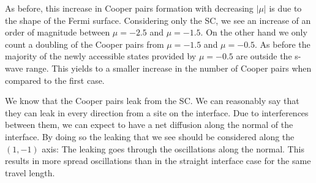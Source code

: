 \documentclass[..\main.tex]{subfile}
\begin{document}
As before, this increase in Cooper pairs formation with decreasing $|\mu|$ is due to the shape of the Fermi surface.
Considering only the SC, we see an increase of an order of magnitude between $\mu=-2.5$ and $\mu=-1.5$. On the other hand we only count
a doubling of the Cooper pairs from $\mu=-1.5$ and $\mu=-0.5$.
As before the majority of the newly accessible states provided by $\mu=-0.5$ are outside the s-wave range.
This yields to a smaller increase in the number of Cooper pairs when compared to the first case.


We know that the Cooper pairs leak from the SC. We can reasonably say that they can leak in every direction from a site on the interface.
Due to interferences between them, we can expect to have a net diffusion along the normal of the interface. By doing so the leaking that we see
should be considered along the $(1,-1)$ axis: The leaking goes through the oscillations along the normal. This results in more spread
oscillations than in the straight interface case for the same travel length.
\end{document}
